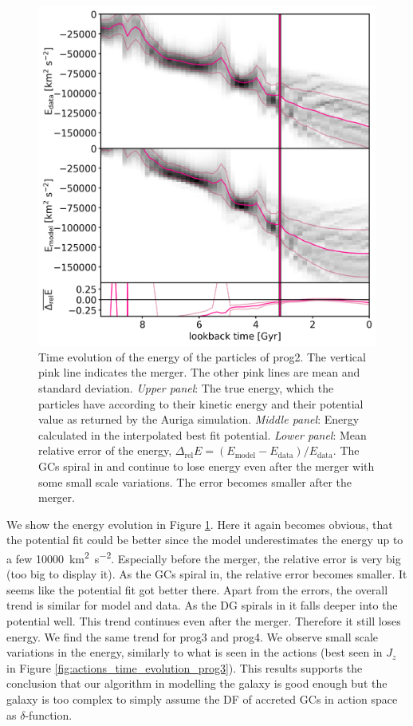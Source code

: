 \begin{figure}[htbp]
\captionsetup{format=plain}
    \centering
	\includegraphics[width=\textwidth]{plots/Dynamics/prog2/energy_time_evolution_gcwodisk_hist_mean.png}
	\caption{Time evolution of the energy of the particles of prog2. The vertical pink line indicates the merger. The other pink lines are mean and standard deviation. \textit{Upper panel}: The true energy, which the particles have according to their kinetic energy and their potential value as returned by the Auriga simulation. \textit{Middle panel}: Energy calculated in the interpolated best fit potential. \textit{Lower panel}: Mean relative error of the energy, $\Delta_\mathrm{rel}E = (E_\mathrm{model}-E_\mathrm{data})/E_\mathrm{data}$. The \acp{GC} spiral in and continue to lose energy even after the merger with some small scale variations. The error becomes smaller after the merger.}\label{fig:energy_time_evolution_prog2}
\end{figure}

We show the energy evolution in Figure \ref{fig:energy_time_evolution_prog2}. Here it again becomes obvious, that the potential fit could be better since the model underestimates the energy up to a few \SI{10000}{km^{2}.s^{-2}}. Especially before the merger, the relative error is very big (too big to display it). As the \acp{GC} spiral in, the relative error becomes smaller. It seems like the potential fit got better there. Apart from the errors, the overall trend is similar for model and data. As the \ac{DG} spirals in it falls deeper into the potential well. This trend continues even after the merger. Therefore it still loses energy. We find the same trend for prog3 and prog4. We observe small scale variations in the energy, similarly to what is seen in the actions (best seen in $J_z$ in Figure \ref{fig:actions_time_evolution_prog3}).
This results supports the conclusion that our algorithm in modelling the galaxy is good enough but the galaxy is too complex to simply assume the \ac{DF} of accreted \acp{GC} in action space as $\delta$-function. 


